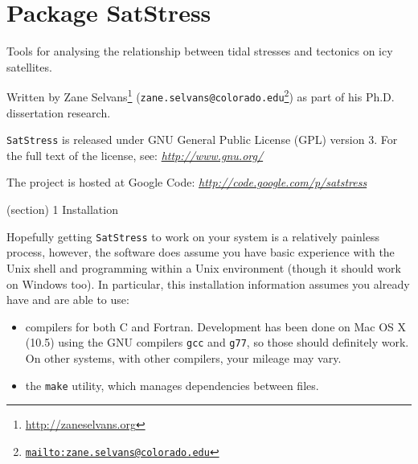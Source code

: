 %
%
%


\section{Package SatStress}

    \label{SatStress}
Tools for analysing the relationship between tidal stresses and tectonics 
on icy satellites.

Written by Zane 
Selvans\footnote{\href{http://zaneselvans.org}{http://zaneselvans.org}} 
(\texttt{zane.selvans@colorado.edu\footnote{\href{mailto:zane.selvans@colorado.edu}{mailto:zane.selvans@colorado.edu}}})
as part of his Ph.D. dissertation research.

\texttt{SatStress} is released under GNU General Public License (GPL) 
version 3.  For the full text of the license, see: 
\href{http://www.gnu.org/}{\textit{http://www.gnu.org/}}

The project is hosted at Google Code: 
\href{http://code.google.com/p/satstress}{\textit{http://code.google.com/p/satstress}}

(section) 1 Installation

  Hopefully getting \texttt{SatStress} to work on your system is a 
  relatively painless process, however, the software does assume you have 
  basic experience with the Unix shell and programming within a Unix 
  environment (though it should work on Windows too).  In particular, this 
  installation information assumes you already have and are able to use:

  \begin{itemize}
  \setlength{\parskip}{0.6ex}
    \item compilers for both C and Fortran.  Development has been done on Mac 
      OS X (10.5) using the GNU compilers \texttt{gcc} and \texttt{g77}, so
      those should definitely work.  On other systems, with other 
      compilers, your mileage may vary.

    \item the \texttt{make} utility, which manages dependencies between files.

  \end{itemize}

